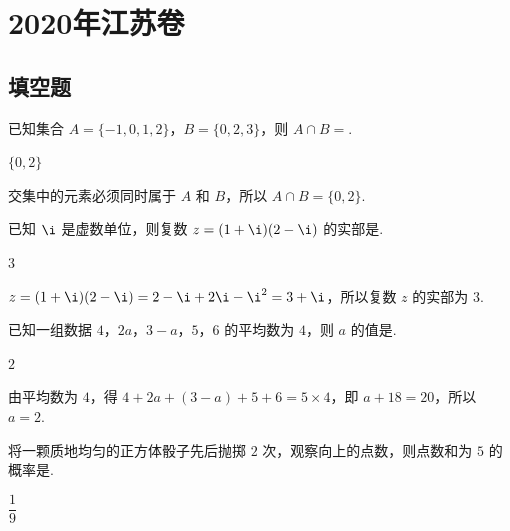 \chapter{2020年江苏卷}

\section{填空题}

\begin{problem}
已知集合 \(A=\{-1,0,1,2\}\)，\(B=\{0,2,3\}\)，则 \(A\cap B=\)\fillinblank{}.
\end{problem}

\begin{answer}
\(\{0,2\}\)
\end{answer}

\begin{solution}
交集中的元素必须同时属于 \(A\) 和 \(B\)，所以 \(A\cap B=\{0,2\}\).
\end{solution}

\begin{problem}
已知 \(\i\) 是虚数单位，则复数 \(z=(1+\i)(2-\i)\) 的实部是\fillinblank{}.
\end{problem}

\begin{answer}
\(3\)
\end{answer}

\begin{solution}
\(z=(1+\i)(2-\i)=2-\i+2\i-\i^2=3+\i\)，所以复数 \(z\) 的实部为 \(3\).
\end{solution}

\begin{problem}
已知一组数据 \(4\)，\(2a\)，\(3-a\)，\(5\)，\(6\) 的平均数为 \(4\)，则 \(a\) 的值是\fillinblank{}.
\end{problem}

\begin{answer}
\(2\)
\end{answer}

\begin{solution}
由平均数为 \(4\)，得 \(4+2a+(3-a)+5+6=5\times4\)，即 \(a+18=20\)，所以 \(a=2\).
\end{solution}

\begin{problem}
将一颗质地均匀的正方体骰子先后抛掷 \(2\) 次，观察向上的点数，则点数和为 \(5\) 的概率是\fillinblank{}.
\end{problem}

\begin{answer}
\(\dfrac19\)
\end{answer}

